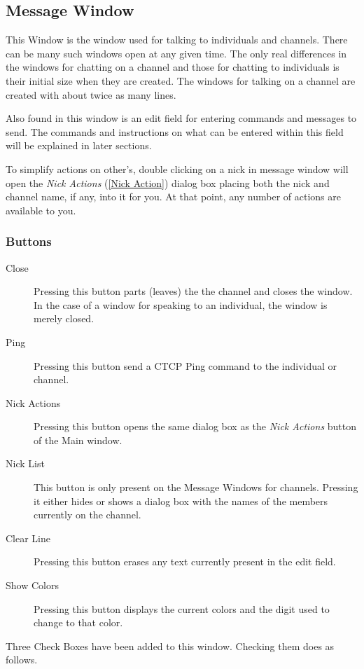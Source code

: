 \documentclass[titlepage]{article}
\begin{document}
\subsection{Message Window}
This Window is the window used for talking to individuals and
channels. There can be many such windows open at any given time. The
only real differences in the windows for chatting on a channel and
those for chatting to individuals is their initial size when they are
created. The windows for talking on a channel are created with about
twice as many lines.

Also found in this window is an edit field for entering commands and
messages to send. The commands and instructions on what can be entered
within this field will be explained in later sections.

To simplify actions on other's, double clicking on a nick in message 
window will open the \emph{Nick Actions} (\ref{Nick Action}) dialog box 
placing both the nick
and channel name, if any, into it for you. At that point, any 
number of actions are available to you.
 
\subsubsection{Buttons}
\begin{description}
\item[Close] Pressing this button parts (leaves) the the channel and
closes the window. In the case of a window for speaking to an
individual, the window is merely closed.
\item[Ping] Pressing this button send a CTCP Ping command to the
individual or channel.
\item[Nick Actions] Pressing this button opens the same dialog box as
the \textit{Nick Actions} button of the Main window.
\item[Nick List] This button is only present on the Message Windows
for channels. Pressing it either hides or shows a dialog box with the
names of the members currently on the channel.
\item[Clear Line] Pressing this button erases any text currently
present in the edit field.
\item[Show Colors] Pressing this button displays the current colors and the digit used
to change to that color.
\end{description}

Three Check Boxes have been added to this window. Checking them does as follows.
\end{document}
